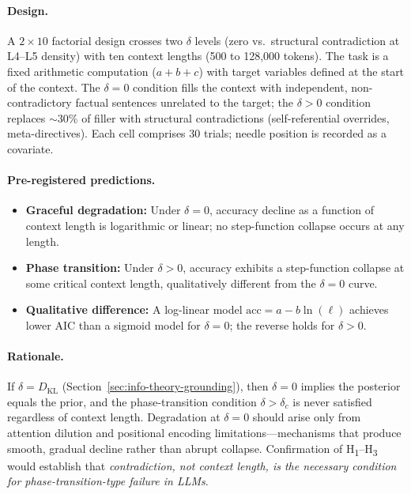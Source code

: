 \documentclass[11pt,a4paper]{article}
\begin{document}
\paragraph{Design.}
A $2 \times 10$ factorial design crosses two $\delta$ levels (zero vs.\ structural contradiction at L4--L5 density) with ten context lengths (500 to 128{,}000 tokens). The task is a fixed arithmetic computation ($a + b + c$) with target variables defined at the start of the context. The $\delta = 0$ condition fills the context with independent, non-contradictory factual sentences unrelated to the target; the $\delta > 0$ condition replaces $\sim$30\% of filler with structural contradictions (self-referential overrides, meta-directives). Each cell comprises 30 trials; needle position is recorded as a covariate.

\paragraph{Pre-registered predictions.}
\begin{itemize}
  \item[\textbf{H\textsubscript{1}}] \textbf{Graceful degradation:} Under $\delta = 0$, accuracy decline as a function of context length is logarithmic or linear; no step-function collapse occurs at any length.
  \item[\textbf{H\textsubscript{2}}] \textbf{Phase transition:} Under $\delta > 0$, accuracy exhibits a step-function collapse at some critical context length, qualitatively different from the $\delta = 0$ curve.
  \item[\textbf{H\textsubscript{3}}] \textbf{Qualitative difference:} A log-linear model $\text{acc} = a - b \ln(\ell)$ achieves lower AIC than a sigmoid model for $\delta = 0$; the reverse holds for $\delta > 0$.
\end{itemize}

\paragraph{Rationale.}
If $\delta = D_{\mathrm{KL}}$ (Section~\ref{sec:info-theory-grounding}), then $\delta = 0$ implies the posterior equals the prior, and the phase-transition condition $\delta > \delta_c$ is never satisfied regardless of context length. Degradation at $\delta = 0$ should arise only from attention dilution and positional encoding limitations---mechanisms that produce smooth, gradual decline rather than abrupt collapse. Confirmation of H\textsubscript{1}--H\textsubscript{3} would establish that \emph{contradiction, not context length, is the necessary condition for phase-transition-type failure in LLMs}.
\end{document}
